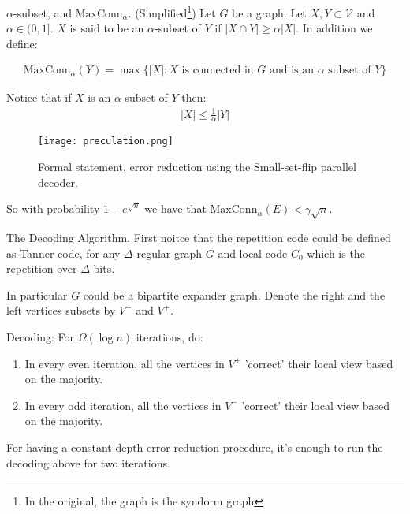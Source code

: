 \documentclass{beamer}
\begin{document}
\newcommand*{\MC}{ \text{MaxConn}_\alpha }
\begin{frame}
  \begin{definition}{$\alpha$-subset, and $\MC$. (Simplified\footnote{In the original, the graph is the syndorm graph}) } 
    Let $G$ be a graph. Let $X,Y \subset \mathcal{V}$ and $\alpha \in (0,1]$. $X$ is said to be an $\alpha$-subset of $Y$ if $|X \cap Y| \ge \alpha |X|$. In addition we define: 
    
    \begin{equation*}
      \begin{split}
        \MC(Y) = \max{ \{ |X| :  X \text{ is connected in  } G \text{ and is an } \alpha \text{ subset of } Y \} }
      \end{split}
    \end{equation*}
  \end{definition}

Notice that if $X$ is an $\alpha$-subset of $Y$ then: 
\begin{equation*}
  \begin{split}
    |X| \le \frac{1}{\alpha} |Y| 
  \end{split}
\end{equation*}

\end{frame}



\begin{frame}

\begin{figure}[h]
    \centering
    \texttt{[image: preculation.png]}
    \caption{ Formal statement, error reduction using the Small-set-flip parallel decoder.}
    \label{fig:your-label}
\end{figure}

So with probability $1 - e^{\sqrt{n}}$ we have that $\MC(E) < \gamma \sqrt{n}$.  

\end{frame}



\begin{frame}{The Decoding Algorithm.}
  First noitce that the repetition code could be defined as Tanner code, for any $\Delta$-regular graph $G$ and local code $C_{0}$ which is the repetition over $\Delta$ bits.   


  In particular $G$ could be a bipartite expander graph. Denote the right and the left vertices subsets by $V^{-}$ and $V^{+}$.
  \begin{block}{Decoding:}
    For $\Omega\left( \log n \right)$ iterations, do: 
  \begin{enumerate}
    \item In every even iteration, all the vertices in $V^{+}$ 'correct' their local view based on the majority.
    \item In every odd iteration, all the vertices in $V^{-}$ 'correct' their local view based on the majority.
  \end{enumerate}
For having a constant depth error reduction procedure, it's enough to run the decoding above for two iterations.
\end{block}

\end{frame}
\end{document}
